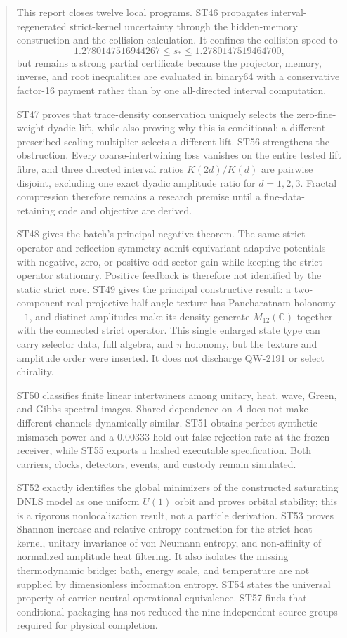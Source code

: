 \documentclass[11pt,a4paper]{article}
\begin{document}
\begin{abstract}
This report closes twelve local programs. ST46 propagates interval-regenerated strict-kernel uncertainty through the hidden-memory construction and the collision calculation. It confines the collision speed to
\[
1.2780147516944267\le s_*\le1.2780147519464700,
\]
but remains a strong partial certificate because the projector, memory, inverse, and root inequalities are evaluated in binary64 with a conservative factor-16 payment rather than by one all-directed interval computation.

ST47 proves that trace-density conservation uniquely selects the zero-fine-weight dyadic lift, while also proving why this is conditional: a different prescribed scaling multiplier selects a different lift. ST56 strengthens the obstruction. Every coarse-intertwining loss vanishes on the entire tested lift fibre, and three directed interval ratios $K(2d)/K(d)$ are pairwise disjoint, excluding one exact dyadic amplitude ratio for $d=1,2,3$. Fractal compression therefore remains a research premise until a fine-data-retaining code and objective are derived.

ST48 gives the batch's principal negative theorem. The same strict operator and reflection symmetry admit equivariant adaptive potentials with negative, zero, or positive odd-sector gain while keeping the strict operator stationary. Positive feedback is therefore not identified by the static strict core. ST49 gives the principal constructive result: a two-component real projective half-angle texture has Pancharatnam holonomy $-1$, and distinct amplitudes make its density generate $M_{12}(\mathbb C)$ together with the connected strict operator. This single enlarged state type can carry selector data, full algebra, and $\pi$ holonomy, but the texture and amplitude order were inserted. It does not discharge QW-2191 or select chirality.

ST50 classifies finite linear intertwiners among unitary, heat, wave, Green, and Gibbs spectral images. Shared dependence on $A$ does not make different channels dynamically similar. ST51 obtains perfect synthetic mismatch power and a $0.00333$ hold-out false-rejection rate at the frozen receiver, while ST55 exports a hashed executable specification. Both carriers, clocks, detectors, events, and custody remain simulated.

ST52 exactly identifies the global minimizers of the constructed saturating DNLS model as one uniform $U(1)$ orbit and proves orbital stability; this is a rigorous nonlocalization result, not a particle derivation. ST53 proves Shannon increase and relative-entropy contraction for the strict heat kernel, unitary invariance of von Neumann entropy, and non-affinity of normalized amplitude heat filtering. It also isolates the missing thermodynamic bridge: bath, energy scale, and temperature are not supplied by dimensionless information entropy. ST54 states the universal property of carrier-neutral operational equivalence. ST57 finds that conditional packaging has not reduced the nine independent source groups required for physical completion.
\end{abstract}
\end{document}
